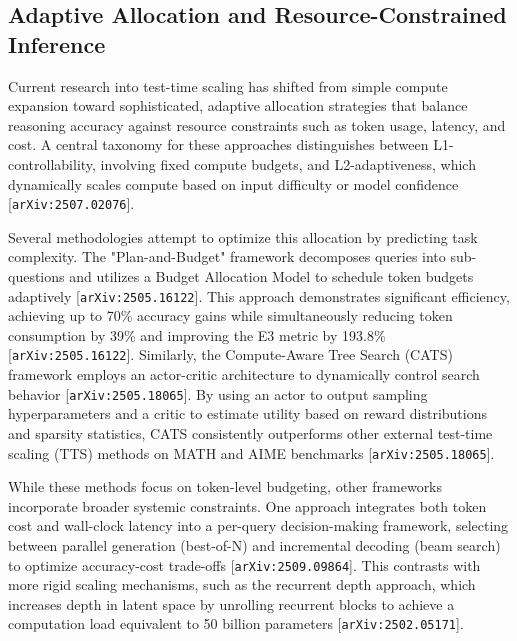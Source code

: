 \documentclass[11pt]{article}
\begin{document}
\subsection{Adaptive Allocation and Resource-Constrained Inference}

Current research into test-time scaling has shifted from simple compute expansion toward sophisticated, adaptive allocation strategies that balance reasoning accuracy against resource constraints such as token usage, latency, and cost. A central taxonomy for these approaches distinguishes between L1-controllability, involving fixed compute budgets, and L2-adaptiveness, which dynamically scales compute based on input difficulty or model confidence [\texttt{arXiv:2507.02076}].

Several methodologies attempt to optimize this allocation by predicting task complexity. The "Plan-and-Budget" framework decomposes queries into sub-questions and utilizes a Budget Allocation Model to schedule token budgets adaptively [\texttt{arXiv:2505.16122}]. This approach demonstrates significant efficiency, achieving up to 70\% accuracy gains while simultaneously reducing token consumption by 39\% and improving the E3 metric by 193.8\% [\texttt{arXiv:2505.16122}]. Similarly, the Compute-Aware Tree Search (CATS) framework employs an actor-critic architecture to dynamically control search behavior [\texttt{arXiv:2505.18065}]. By using an actor to output sampling hyperparameters and a critic to estimate utility based on reward distributions and sparsity statistics, CATS consistently outperforms other external test-time scaling (TTS) methods on MATH and AIME benchmarks [\texttt{arXiv:2505.18065}].

While these methods focus on token-level budgeting, other frameworks incorporate broader systemic constraints. One approach integrates both token cost and wall-clock latency into a per-query decision-making framework, selecting between parallel generation (best-of-N) and incremental decoding (beam search) to optimize accuracy-cost trade-offs [\texttt{arXiv:2509.09864}]. This contrasts with more rigid scaling mechanisms, such as the recurrent depth approach, which increases depth in latent space by unrolling recurrent blocks to achieve a computation load equivalent to 50 billion parameters [\texttt{arXiv:2502.05171}].
\end{document}
